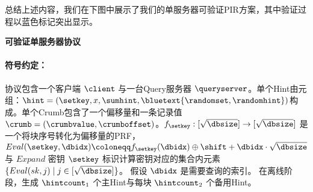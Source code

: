 总结上述内容，我们在下图中展示了我们的单服务器可验证PIR方案，其中验证过程以蓝色标记突出显示。

    \begin{mdframed}
    \centering
    \textbf{可验证单服务器协议}
        \raggedright
        \paragraph{符号约定：} 协议包含一个客户端 $\client$ 与一台Query服务器 $\queryserver$。单个Hint由元组：$\hint=(\setkey,x,\sumhint,\bluetext{\randomset,\randomhint})$构成。单个Crumb包含了一个偏移量和一条记录值 $\crumb=(\crumbvalue, \crumboffset)$。$f_{\setkey}: [\sqrt{\dbsize}]\to [\sqrt{\dbsize}]$ 是一个将块序号转化为偏移量的PRF， $Eval(\setkey,\dbidx) \coloneqq f_{\setkey}(\dbidx)\oplus \shift + \dbidx\cdot\sqrt{\dbsize}$ 与 $Expand$ 密钥 $\setkey$ 标识计算密钥对应的集合内元素 $\{Eval(sk,j) \mid j\in[\sqrt{\dbsize}]\}$。  假设 $\dbidx$ 是需要查询的索引。 在离线阶段，生成 $\hintcount_1$ 个主Hint与每块 $\hintcount_2$ 个备用Hint。


\end{mdframed}

